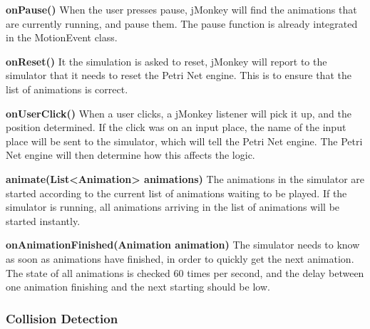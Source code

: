 \textbf{onPause()}
When the user presses pause, jMonkey will find the animations that are currently running, and pause them. The pause function is already integrated in the MotionEvent class.

\textbf{onReset()}
It the simulation is asked to reset, jMonkey will report to the simulator that it needs to reset the Petri Net engine. This is to ensure that the list of animations is correct.

\textbf{onUserClick()}
When a user clicks, a jMonkey listener will pick it up, and the position determined. If the click was on an input place, the name of the input place will be sent to the simulator, which will tell the Petri Net engine. The Petri Net engine will then determine how this affects the logic.

\textbf{animate(List<Animation> animations)}
The animations in the simulator are started according to the current list of animations waiting to be played. If the simulator is running, all animations arriving in the list of animations will be started instantly.

\textbf{onAnimationFinished(Animation animation)}
The simulator needs to know as soon as animations have finished, in order to quickly get the next animation. The state of all animations is checked 60 times per second, and the delay between one animation finishing and the next starting should be low.

\subsubsection{Collision Detection}
